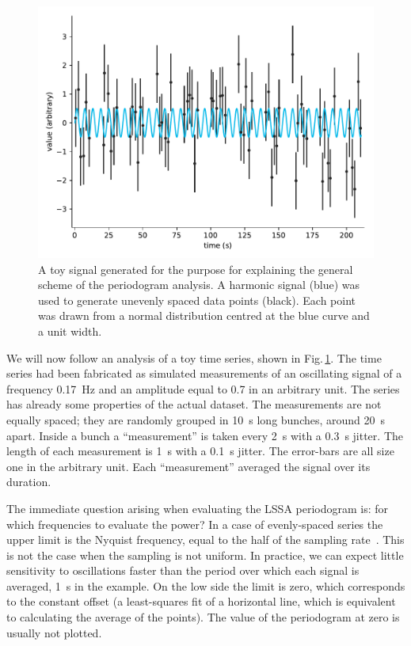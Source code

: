 \begin{figure}
  \centering
  \includegraphics[width=\linewidth]{gfx/axions/basic_signal.pdf}
  \caption{A toy signal generated for the purpose for explaining the general scheme of the periodogram analysis. A harmonic signal (blue) was used to generate unevenly spaced data points (black). Each point was drawn from a normal distribution centred at the blue curve and a unit width.}\label{fig:basic_signal}
\end{figure}

We will now follow an analysis of a toy time series, shown in Fig.\,\ref{fig:basic_signal}. The time series had been fabricated as simulated measurements of an oscillating signal of a frequency \SI{0.17}{\hertz} and an amplitude equal to \num{0.7} in an arbitrary unit.
The series has already some properties of the actual dataset. The measurements are not equally spaced; they are randomly grouped in \SI{10}{\second} long bunches, around \SI{20}{\second} apart. Inside a bunch a ``measurement'' is taken every \SI{2}{\second} with a \SI{0.3}{\second} jitter. The length of each measurement is \SI{1}{\second} with a \SI{0.1}{\second} jitter. The error-bars are all size one in the arbitrary unit. Each ``measurement'' averaged the signal over its duration.

The immediate question arising when evaluating the LSSA periodogram is: for which frequencies to evaluate the power? In a case of evenly-spaced series the upper limit is the Nyquist frequency, equal to the half of the sampling rate~\cite{Shannon1949}.
This is not the case when the sampling is not uniform. In practice, we can expect little sensitivity to oscillations faster than the period over which each signal is averaged, \SI{1}{\second} in the example. On the low side the limit is zero, which corresponds to the constant offset (a least-squares fit of a horizontal line, which is equivalent to calculating the average of the points). The value of the periodogram at zero is usually not plotted.

